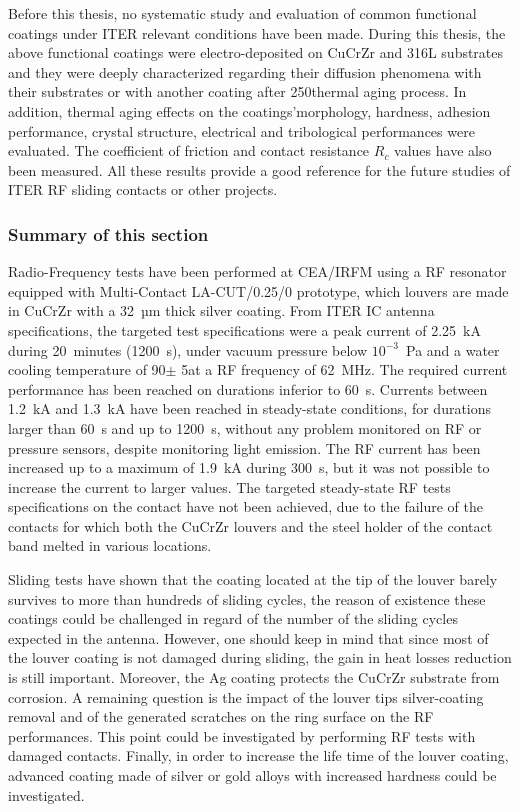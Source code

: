 {Before this thesis, no systematic study and evaluation of common functional coatings under ITER relevant conditions have been made. During this thesis, the above functional coatings were electro-deposited on CuCrZr and 316L substrates and they were deeply characterized regarding their diffusion phenomena with their substrates or with another coating after 250\degC thermal aging process. In addition, thermal aging effects on the coatings'morphology, hardness, adhesion performance, crystal structure, electrical and tribological performances were evaluated. The coefficient of friction and contact resistance $R_c$ values have also been measured. All these results provide a good reference for the future studies of ITER RF sliding contacts or other projects.


\subsubsection{Summary of this section}

Radio-Frequency tests have been performed at CEA/IRFM using a RF resonator equipped with Multi-Contact LA-CUT/0.25/0 prototype, which louvers are made in CuCrZr with a 32~µm thick silver coating. From ITER IC antenna specifications, the targeted test specifications were a peak current of 2.25~kA during 20~minutes (1200~s), under vacuum pressure below $10^{-3}$~Pa and a water cooling temperature of 90\degC $\pm$ 5\degC at a RF frequency of 62~MHz. The required current performance has been reached on durations inferior to 60~s. Currents between 1.2~kA and 1.3~kA have been reached in steady-state conditions, for durations larger than 60~s and up to 1200~s, without any problem monitored on RF or pressure sensors, despite monitoring light emission. The RF current has been increased up to a maximum of 1.9~kA during 300~s, but it was not possible to increase the current to larger values. The targeted steady-state RF tests specifications on the contact have not been achieved, due to the failure of the contacts for which both the CuCrZr louvers and the steel holder of the contact band melted in various locations. 

Sliding tests have shown that the coating located at the tip of the louver barely survives to more than hundreds of sliding cycles, the reason of existence these coatings could be challenged in regard of the number of the sliding cycles expected in the antenna. However, one should keep in mind that since most of the louver coating is not damaged during sliding, the gain in heat losses reduction is still important. Moreover, the Ag coating protects the CuCrZr substrate from corrosion. A remaining question is the impact of the louver tips silver-coating removal and of the generated scratches on the ring surface on the RF performances. This point could be investigated by performing RF tests with damaged contacts. Finally, in order to increase the life time of the louver coating, advanced coating made of silver or gold alloys with increased hardness could be investigated.

}
